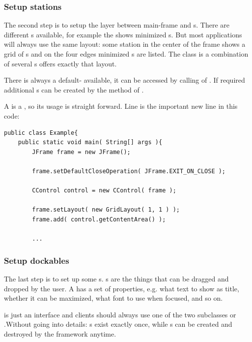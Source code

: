 \subsubsection{Setup stations}
The second step is to setup the layer between main-frame and s. There are different s available, for example the  shows minimized s. But most applications will always use the same layout: some station in the center of the frame shows a grid of s and on the four edges minimized s are listed. The class  is a combination of several s offers exactly that layout.

There is always a default- available, it can be accessed by calling  of . If required additional s can be created by the method  of .

A  is a , so its usage is straight forward. Line  is the important new line in this code:
\begin{lstlisting}
public class Example{
	public static void main( String[] args ){
		JFrame frame = new JFrame();
		
		frame.setDefaultCloseOperation( JFrame.EXIT_ON_CLOSE );
		
		CControl control = new CControl( frame );
		
		frame.setLayout( new GridLayout( 1, 1 ) );
		frame.add( control.getContentArea() );
		
		...
\end{lstlisting}


\subsubsection{Setup dockables}
The last step is to set up some s. s are the things that can be dragged and dropped by the user. A  has a set of properties, e.g. what text to show as title, whether it can be maximized, what font to use when focused, and so on.

 is just an interface and clients should always use one of the two subclasses  or .Without going into details: s exist exactly once, while \linebreak {}s can be created and destroyed by the framework anytime.

